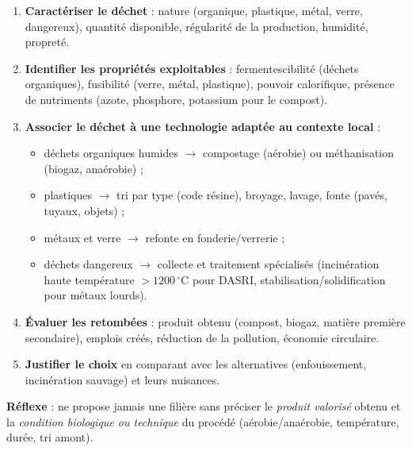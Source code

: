 \documentclass[11pt]{article}
\newcommand{\cle}[1]{{\popxbold\color{popdark}#1}}
\begin{document}
\begin{methode}
\begin{enumerate}
\item \textbf{Caractériser le déchet} : nature (organique, plastique, métal, verre, dangereux), quantité disponible, régularité de la production, humidité, propreté.
\item \textbf{Identifier les propriétés exploitables} : fermentescibilité (déchets organiques), fusibilité (verre, métal, plastique), pouvoir calorifique, présence de nutriments (azote, phosphore, potassium pour le compost).
\item \textbf{Associer le déchet à une technologie adaptée au contexte local} :
\begin{itemize}
\item déchets organiques humides $\rightarrow$ \cle{compostage} (aérobie) ou \cle{méthanisation} (biogaz, anaérobie) ;
\item plastiques $\rightarrow$ tri par type (code résine), broyage, lavage, fonte (pavés, tuyaux, objets) ;
\item métaux et verre $\rightarrow$ refonte en fonderie/verrerie ;
\item déchets dangereux $\rightarrow$ collecte et traitement spécialisés (incinération haute température $>1200\,^\circ\mathrm{C}$ pour DASRI, stabilisation/solidification pour métaux lourds).
\end{itemize}
\item \textbf{Évaluer les retombées} : produit obtenu (compost, biogaz, matière première secondaire), emplois créés, réduction de la pollution, économie circulaire.
\item \textbf{Justifier le choix} en comparant avec les alternatives (enfouissement, incinération sauvage) et leurs nuisances.
\end{enumerate}
\textbf{Réflexe} : ne propose jamais une filière sans préciser le \emph{produit valorisé} obtenu et la \emph{condition biologique ou technique} du procédé (aérobie/anaérobie, température, durée, tri amont).
\end{methode}
\end{document}
